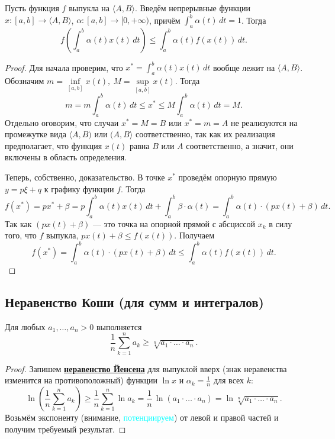 \begin{theorem} \hypertarget{Йенсен-интегралы}{}
	Пусть функция \(f\) выпукла на \(\langle A, B \rangle\). Введём непрерывные функции \(x \colon [a, b] \to \langle A, B \rangle\), \(\alpha \colon [a, b] \to [0, +\infty)\), причём \(\int_a^b \alpha(t) \, dt = 1\). Тогда \[
	f \left(\int_a^b \alpha(t) x(t) \, dt \right) \leqslant \int_a^b \alpha(t) f(x(t)) \, dt.
	\]
\end{theorem}
\begin{proof}
	Для начала проверим, что \(x^* = \int_a^b \alpha(t) x(t) \, dt\) вообще лежит на \(\langle A, B \rangle\). Обозначим \(m = \inf\limits_{[a, b]} x(t), \ M = \sup\limits_{[a, b]} x(t)\). Тогда \[
	m = m \int_a^b \alpha(t) \, dt \leqslant x^* \leqslant M \int_a^b \alpha(t) \, dt = M.
	\]
	Отдельно оговорим, что случаи \(x^* = M = B\) или \(x^* = m = A\) не реализуются на промежутке вида  \(\langle A, B)\) или \((A, B \rangle\) соответственно, так как их реализация предполагает, что функция \(x(t)\) равна \(B\) или \(A\) соответственно, а значит, они включены в область определения.
	
	Теперь, собственно, доказательство. В точке \(x^*\) проведём опорную прямую \(y = p \xi + q\) к графику функции \(f\). Тогда \[
	f(x^*) = px^* + \beta = p \int_a^b \alpha(t) x(t) \, dt + \int_a^b \beta \cdot \alpha(t) = \int_a^b \alpha(t) \cdot (p x(t) + \beta) \, dt.
	\]
	Так как \((px(t) + \beta)\) --- это точка на опорной прямой с абсциссой \(x_k\) в силу того, что \(f\) выпукла, \(px(t) + \beta \leqslant f(x(t))\). Получаем \[
	f(x^*) = \int_a^b \alpha(t) \cdot (p x(t) + \beta) \, dt \leqslant \int_a^b \alpha(t) f(x(t)) \, dt.
	\]
\end{proof}

\subsection{Неравенство Коши (для сумм и интегралов)}

\begin{ntheorem}
	Для любых \(a_1, \ldots, a_n > 0\) выполняется \[
	\frac{1}{n} \sum_{k=1}^n a_k \geqslant \sqrt[n]{a_1 \cdot \ldots \cdot a_n}.
	\]
\end{ntheorem}
\begin{proof}
	Запишем \hyperlink{Йенсен-суммы}{\bfseries неравенство Йенсена} для выпуклой вверх (знак неравенства изменится на противоположный) функции \(\ln x\) и \(\alpha_k = \frac{1}{n}\) для всех \(k\): \[
	\ln \left(\frac{1}{n} \sum_{k=1}^n a_k \right) \geqslant \frac{1}{n} \sum_{k=1}^n \ln a_k = \frac{1}{n} \, \ln (a_1 \cdot \ldots \cdot a_n) = \ln \sqrt[n]{a_1 \cdot \ldots \cdot a_n}.
	\]
	Возьмём экспоненту (внимание, \textcolor{cyan}{потенциируем}) от левой и правой частей и получим требуемый результат.
\end{proof}

